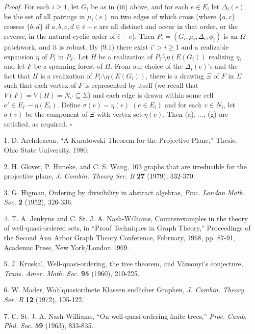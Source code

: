 \textit{Proof.} For each $i \ge 1$, let $G_i$ be as in (iii) above, and for each $e \in E_i$ let $\Delta_i(e)$ be the set of all pairings in $\bar{\mu}_i(e)$ no two edges of which cross (where $\{a, c\}$ crosses $\{b, d\}$ if $a, b, c, d \in \bar{e} - e$ are all distinct and occur in that order, or the reverse, in the natural cyclic order of $\bar{e} - e$). Then $P_i = (G_i, \mu_i, \Delta_i, \phi_i)$ is an $\Omega$-patchwork, and it is robust. By (9.1) there exist $i' > i \ge 1$ and a realizable expansion $\eta$ of $P_i$ in $P_{i'}$. Let $H$ be a realization of $P_{i'} \setminus \eta(E(G_i))$ realizing $\eta$, and let $F$ be a spanning forest of $H$. From our choice of the $\Delta_i(e)$'s and the fact that $H$ is a realization of $P_{i'} \setminus \eta(E(G_i))$, there is a drawing $\Xi$ of $F$ in $\Sigma$ such that each vertex of $F$ is represented by itself (we recall that $V(F) = V(H) = N_{i'} \subseteq \Sigma$) and each edge is drawn within some cell $e' \in E_{i'} - \eta(E_i)$. Define $\sigma(e) = \eta(e)$ $(e \in E_i)$ and for each $v \in N_i$, let $\sigma(v)$ be the component of $\Xi$ with vertex set $\eta(v)$. Then (a), ..., (g) are satisfied, as required. $\square$


1. D. Archdeacon, ``A Kuratowski Theorem for the Projective Plane,'' Thesis, Ohio State University, 1980.

2. H. Glover, P. Huneke, and C. S. Wang, 103 graphs that are irreducible for the projective plane, \textit{J. Combin. Theory Ser. B} \textbf{27} (1979), 332-370.

3. G. Higman, Ordering by divisibility in abstract algebras, \textit{Proc. London Math. Soc.} \textbf{2} (1952), 326-336.

4. T. A. Jenkyns and C. St. J. A. Nash-Williams, Counterexamples in the theory of well-quasi-ordered sets, in ``Proof Techniques in Graph Theory,'' Proceedings of the Second Ann Arbor Graph Theory Conference, February, 1968, pp. 87-91, Academic Press, New York/London 1969.

5. J. Kruskal, Well-quasi-ordering, the tree theorem, and V\'azsonyi's conjecture, \textit{Trans. Amer. Math. Soc.} \textbf{95} (1960), 210-225.

6. W. Mader, Wohlquasiordnete Klassen endlicher Graphen, \textit{J. Combin. Theory Ser. B} \textbf{12} (1972), 105-122.

7. C. St. J. A. Nash-Williams, ``On well-quasi-ordering finite trees,'' \textit{Proc. Camb. Phil. Soc.} \textbf{59} (1963), 833-835.

